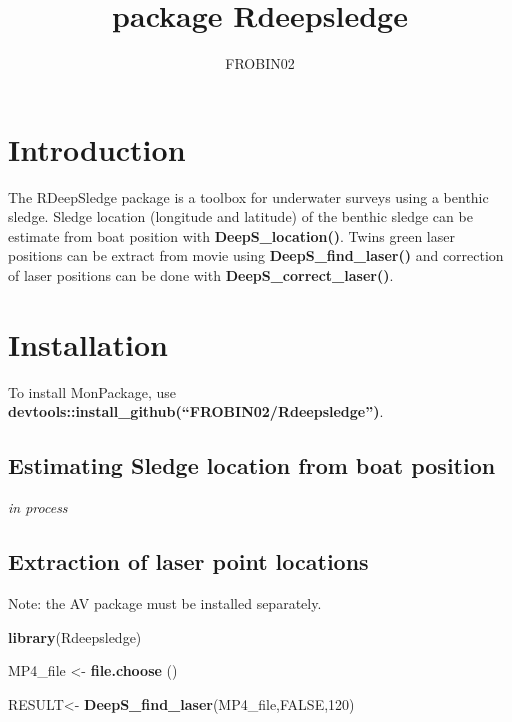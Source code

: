 \documentclass[
]{article}
\title{package Rdeepsledge}
\author{FROBIN02}
\date{}
\newenvironment{Shaded}{\begin{snugshade}}{\end{snugshade}}
\newcommand{\ConstantTok}[1]{\textcolor[rgb]{0.56,0.35,0.01}{#1}}
\newcommand{\DecValTok}[1]{\textcolor[rgb]{0.00,0.00,0.81}{#1}}
\newcommand{\FunctionTok}[1]{\textcolor[rgb]{0.13,0.29,0.53}{\textbf{#1}}}
\newcommand{\NormalTok}[1]{#1}
\newcommand{\OtherTok}[1]{\textcolor[rgb]{0.56,0.35,0.01}{#1}}
\begin{document}
\maketitle

\hypertarget{introduction}{%
\section{Introduction}\label{introduction}}

The RDeepSledge package is a toolbox for underwater surveys using a
benthic sledge. Sledge location (longitude and latitude) of the benthic
sledge can be estimate from boat position with
\textbf{DeepS\_location()}. Twins green laser positions can be extract
from movie using \textbf{DeepS\_find\_laser()} and correction of laser
positions can be done with \textbf{DeepS\_correct\_laser()}.

\hypertarget{installation}{%
\section{Installation}\label{installation}}

To install MonPackage, use
\textbf{devtools::install\_github(``FROBIN02/Rdeepsledge'')}.

\hypertarget{estimating-sledge-location-from-boat-position}{%
\subsection{Estimating Sledge location from boat
position}\label{estimating-sledge-location-from-boat-position}}

\emph{in process}

\hypertarget{extraction-of-laser-point-locations}{%
\subsection{Extraction of laser point
locations}\label{extraction-of-laser-point-locations}}

Note: the AV package must be installed separately.

\begin{Shaded}
\begin{Highlighting}[]
\FunctionTok{library}\NormalTok{(Rdeepsledge)}

\NormalTok{MP4\_file }\OtherTok{\textless{}{-}} \FunctionTok{file.choose}\NormalTok{ ()}

\NormalTok{RESULT}\OtherTok{\textless{}{-}} \FunctionTok{DeepS\_find\_laser}\NormalTok{(MP4\_file,}\ConstantTok{FALSE}\NormalTok{,}\DecValTok{120}\NormalTok{)}
\end{Highlighting}
\end{Shaded}
\end{document}
